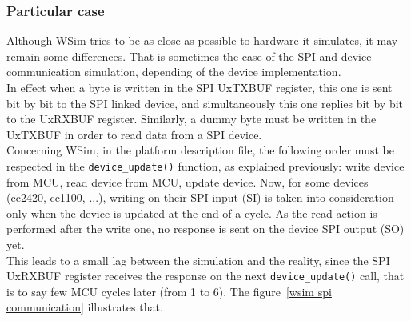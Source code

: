 \documentclass[a4paper,10pt]{report}
\begin{document}
\subsubsection{Particular case}
Although WSim tries to be as close as possible to hardware it simulates, it may remain some differences. That is sometimes the case of the SPI and device communication simulation, depending of the device implementation.\\

In effect when a byte is written in the SPI UxTXBUF register, this one is sent bit by bit to the SPI linked device, and simultaneously this one replies bit by bit to the UxRXBUF register. Similarly, a dummy byte must be written in the UxTXBUF in order to read data from a SPI device.\\

Concerning WSim, in the platform description file, the following order must be respected in the \verb$device_update()$ function, as explained previously: write device from MCU, read device from MCU, update device.
Now, for some devices (cc2420, cc1100, ...), writing on their SPI input (SI) is taken into consideration only when the device is updated at the end of a cycle. As the read action is performed after the write one, no response is sent on the device SPI output (SO) yet.\\

This leads to a small lag between the simulation and the reality, since the SPI UxRXBUF register receives the response on the next \verb$device_update()$ call, that is to say few MCU cycles later (from 1 to 6).
The figure~\ref{wsim spi communication} illustrates that.\\
\end{document}
